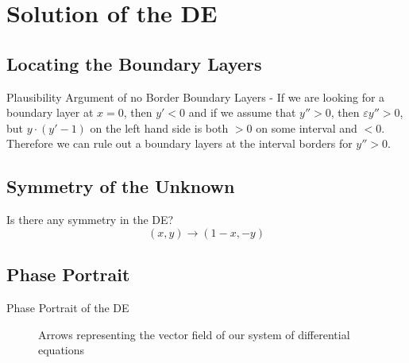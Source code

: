 \section{Solution of the DE}%
\label{sec:solution_of_the_de}


\subsection{Locating the Boundary Layers}%
\label{sub:locating_the_boundary_layers}

\begin{frame}{Plausibility Argument of no Border Boundary Layers - \cite{holmes2012}}
    If we are looking for a boundary layer at \(x = 0\), then \(y' < 0\) and if we assume that \(y'' > 0\), then
    \(\varepsilon y'' > 0\), but \(y\cdot (y' - 1)\) on the left hand side is both \(>0\) on some interval and \(<0\).
    Therefore we can rule out a boundary layers at the interval borders for \(y'' > 0\).
\end{frame}


\subsection{Symmetry of the Unknown}%
\label{sub:symmetry_of_the_unknown}
\begin{frame}
  Is there any symmetry in the DE? \\ \pause
  \[
      (x,y) \to (1-x, -y)
  \] 
\end{frame}

\subsection{Phase Portrait}%
\label{sub:phase_portrait}

\begin{frame}{Phase Portrait of the DE}
    \pause
\end{frame}

\begin{frame}
  \begin{figure}
    \centering
    \caption{Arrows representing the vector field of our system of differential equations}
  \end{figure}
\end{frame}

